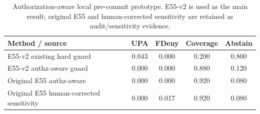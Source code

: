 \begin{table}[t]
\centering
\small
\caption{Authorization-aware local pre-commit prototype. E55-v2 is used as the main result; original E55 and human-corrected sensitivity are retained as audit/sensitivity evidence.}
\label{tab:precommit}
\begin{tabular}{lcccc}
\toprule
Method / source & UPA & FDeny & Coverage & Abstain \\
\midrule
E55-v2 existing hard guard & 0.043 & 0.000 & 0.200 & 0.800 \\
E55-v2 authz-aware guard & 0.000 & 0.000 & 0.880 & 0.120 \\
Original E55 authz-aware & 0.000 & 0.000 & 0.920 & 0.080 \\
Original E55 human-corrected sensitivity & 0.000 & 0.017 & 0.920 & 0.080 \\
\bottomrule
\end{tabular}
\end{table}
